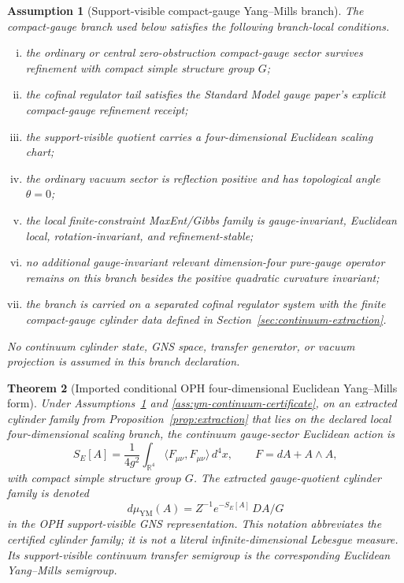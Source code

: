 \documentclass[11pt]{article}
\numberwithin{equation}{section}
\newtheorem{theorem}{Theorem}[section]
\newtheorem{assumption}[theorem]{Assumption}
\theoremstyle{remark}
\newcommand{\YM}{\mathrm{YM}}
\newcommand{\R}{\mathbb R}
\begin{document}
\begin{assumption}[Support-visible compact-gauge Yang--Mills branch]
\label{ass:ym-branch}
The compact-gauge branch used below satisfies the following branch-local conditions.
\begin{enumerate}[(i)]
\item the ordinary or central zero-obstruction compact-gauge sector survives refinement with compact simple structure group \(G\);
\item the cofinal regulator tail satisfies the Standard Model gauge paper's explicit compact-gauge refinement receipt;
\item the support-visible quotient carries a four-dimensional Euclidean scaling chart;
\item the ordinary vacuum sector is reflection positive and has topological angle \(\theta=0\);
\item the local finite-constraint MaxEnt/Gibbs family is gauge-invariant, Euclidean local, rotation-invariant, and refinement-stable;
\item no additional gauge-invariant relevant dimension-four pure-gauge operator remains on this branch besides the positive quadratic curvature invariant;
\item the branch is carried on a separated cofinal regulator system with the finite compact-gauge
cylinder data defined in Section~\ref{sec:continuum-extraction}.
\end{enumerate}
No continuum cylinder state, GNS space, transfer generator, or vacuum projection is assumed in
this branch declaration.
\end{assumption}

\begin{theorem}[Imported conditional OPH four-dimensional Euclidean Yang--Mills form]
\label{thm:ym-form}
Under Assumptions~\ref{ass:ym-branch} and \ref{ass:ym-continuum-certificate}, on an extracted cylinder family from
Proposition~\ref{prop:extraction} that lies on the declared local four-dimensional scaling branch,
the continuum gauge-sector Euclidean action is
\[
S_E[A]=\frac{1}{4g^2}\int_{\R^4}
\langle F_{\mu\nu},F_{\mu\nu}\rangle\,d^4x,
\qquad
F=dA+A\wedge A,
\tag{YM}
\]
with compact simple structure group \(G\). The extracted gauge-quotient cylinder family is denoted
\[
d\mu_{\YM}(A)=Z^{-1}e^{-S_E[A]}\,D A/G
\]
in the OPH support-visible GNS representation. This notation abbreviates the certified cylinder
family; it is not a literal infinite-dimensional Lebesgue measure. Its support-visible continuum
transfer semigroup is the corresponding Euclidean Yang--Mills semigroup.
\end{theorem}
\end{document}
